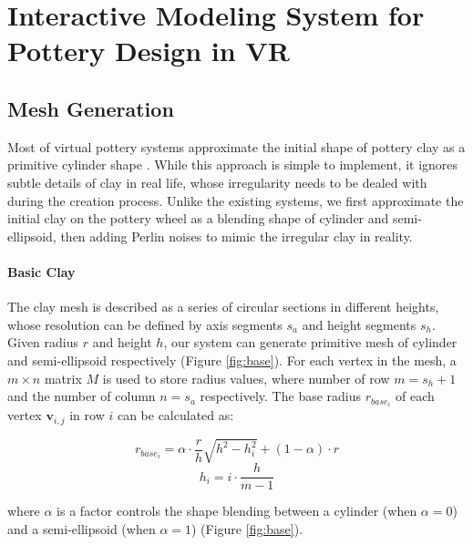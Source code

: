\documentclass{svjour3}                     %
\begin{document}
\section{Interactive Modeling System for Pottery Design in VR}
\label{sec:4}

\subsection{Mesh Generation}
\label{sec:4.1}

Most of virtual pottery systems approximate the initial shape of pottery clay as a primitive cylinder shape \cite{han2007ar,ramani2015gesture,Vinayak2016Extracting}. While this approach is simple to implement, it ignores subtle details of clay in real life, whose irregularity needs to be dealed with during the creation process. Unlike the existing systems, we first approximate the initial clay on the pottery wheel as a blending shape of cylinder and semi-ellipsoid, then adding Perlin noises to mimic the irregular clay in reality.

\paragraph{Basic Clay} The clay mesh is described as a series of circular sections in different heights, whose resolution can be defined by axis segments $s_{a}$ and height segments $s_{h}$. Given radius $r$ and height $h$, our system can generate primitive mesh of cylinder and semi-ellipsoid respectively (Figure \ref{fig:base}).
For each vertex in the mesh, a $m \times n$ matrix $M$ is used to store radius values, where number of row $m = s_{h} + 1$ and the number of column $n = s_{a}$ respectively. The base radius $r_{base_{i}}$ of each vertex $\mathbf{v}_{i,j}$ in row $i$ can be calculated as: 

\begin{equation}
r_{base_{i}} = \alpha \cdot \frac{r}{h} \sqrt{h^2 -  h_{i}^2} + (1 - \alpha) \cdot r
\end{equation}
\begin{equation}
h_{i} = i \cdot \frac{h}{m-1}
\end{equation}

where $\alpha$ is a factor controls the shape blending between a  cylinder (when $\alpha=0$) and a semi-ellipsoid (when $\alpha=1$) (Figure \ref{fig:base}).
\end{document}

